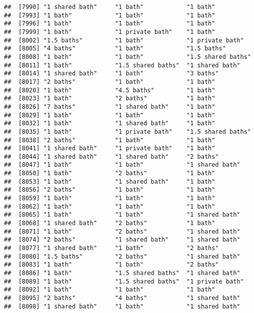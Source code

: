 \documentclass[
]{article}
\begin{document}
\begin{verbatim}
##  [7990] "1 shared bath"     "1 bath"            "1 bath"           
##  [7993] "1 bath"            "1 bath"            "1 bath"           
##  [7996] "1 bath"            "1 bath"            "1 bath"           
##  [7999] "1 bath"            "1 private bath"    "1 bath"           
##  [8002] "1.5 baths"         "1 bath"            "1 private bath"   
##  [8005] "4 baths"           "1 bath"            "1.5 baths"        
##  [8008] "1 bath"            "1 bath"            "1.5 shared baths" 
##  [8011] "1 bath"            "1.5 shared baths"  "1 shared bath"    
##  [8014] "1 shared bath"     "1 bath"            "3 baths"          
##  [8017] "2 baths"           "1 bath"            "1 bath"           
##  [8020] "1 bath"            "4.5 baths"         "1 bath"           
##  [8023] "1 bath"            "2 baths"           "1 bath"           
##  [8026] "7 baths"           "1 shared bath"     "1 bath"           
##  [8029] "1 bath"            "1 bath"            "1 bath"           
##  [8032] "1 bath"            "1 shared bath"     "1 bath"           
##  [8035] "1 bath"            "1 private bath"    "1.5 shared baths" 
##  [8038] "2 baths"           "1 bath"            "1 bath"           
##  [8041] "1 shared bath"     "1 private bath"    "1 bath"           
##  [8044] "1 shared bath"     "1 shared bath"     "2 baths"          
##  [8047] "1 bath"            "1 bath"            "1 shared bath"    
##  [8050] "1 bath"            "2 baths"           "1 bath"           
##  [8053] "1 bath"            "1 shared bath"     "1 bath"           
##  [8056] "2 baths"           "1 bath"            "1 bath"           
##  [8059] "1 bath"            "1 bath"            "1 bath"           
##  [8062] "1 bath"            "1 bath"            "1 bath"           
##  [8065] "1 bath"            "1 bath"            "1 shared bath"    
##  [8068] "1 shared bath"     "2 baths"           "1 bath"           
##  [8071] "1 bath"            "2 baths"           "1 shared bath"    
##  [8074] "2 baths"           "1 shared bath"     "1 shared bath"    
##  [8077] "1 shared bath"     "1 bath"            "2 baths"          
##  [8080] "1.5 baths"         "2 baths"           "1 shared bath"    
##  [8083] "1 bath"            "1 bath"            "2 baths"          
##  [8086] "1 bath"            "1.5 shared baths"  "1 shared bath"    
##  [8089] "1 bath"            "1.5 shared baths"  "1 private bath"   
##  [8092] "1 bath"            "1 bath"            "1 bath"           
##  [8095] "2 baths"           "4 baths"           "1 shared bath"    
##  [8098] "1 shared bath"     "1 bath"            "1 shared bath"    

\end{verbatim}
\end{document}

